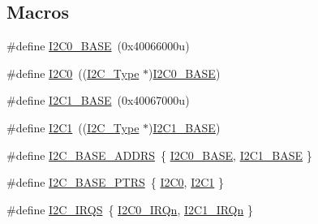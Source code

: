 \subsection*{Macros}
\begin{DoxyCompactItemize}
\item 
\#define \mbox{\hyperlink{group___i2_c___peripheral___access___layer_gabf0928baf4e4350633ca9050b65d1939}{I2\+C0\+\_\+\+B\+A\+SE}}~(0x40066000u)
\item 
\#define \mbox{\hyperlink{group___i2_c___peripheral___access___layer_ga86abb2e8858d177c04e60c41e9242045}{I2\+C0}}~((\mbox{\hyperlink{struct_i2_c___type}{I2\+C\+\_\+\+Type}} $\ast$)\mbox{\hyperlink{group___i2_c___peripheral___access___layer_gabf0928baf4e4350633ca9050b65d1939}{I2\+C0\+\_\+\+B\+A\+SE}})
\item 
\#define \mbox{\hyperlink{group___i2_c___peripheral___access___layer_gacd72dbffb1738ca87c838545c4eb85a3}{I2\+C1\+\_\+\+B\+A\+SE}}~(0x40067000u)
\item 
\#define \mbox{\hyperlink{group___i2_c___peripheral___access___layer_gab45d257574da6fe1f091cc45b7eda6cc}{I2\+C1}}~((\mbox{\hyperlink{struct_i2_c___type}{I2\+C\+\_\+\+Type}} $\ast$)\mbox{\hyperlink{group___i2_c___peripheral___access___layer_gacd72dbffb1738ca87c838545c4eb85a3}{I2\+C1\+\_\+\+B\+A\+SE}})
\item 
\#define \mbox{\hyperlink{group___i2_c___peripheral___access___layer_gae92fd6c5f532d79f1a47e76c6dbc33f0}{I2\+C\+\_\+\+B\+A\+S\+E\+\_\+\+A\+D\+D\+RS}}~\{ \mbox{\hyperlink{group___i2_c___peripheral___access___layer_gabf0928baf4e4350633ca9050b65d1939}{I2\+C0\+\_\+\+B\+A\+SE}}, \mbox{\hyperlink{group___i2_c___peripheral___access___layer_gacd72dbffb1738ca87c838545c4eb85a3}{I2\+C1\+\_\+\+B\+A\+SE}} \}
\item 
\#define \mbox{\hyperlink{group___i2_c___peripheral___access___layer_gaee17f364d6d1712b62774e6c33dea554}{I2\+C\+\_\+\+B\+A\+S\+E\+\_\+\+P\+T\+RS}}~\{ \mbox{\hyperlink{group___i2_c___peripheral___access___layer_ga86abb2e8858d177c04e60c41e9242045}{I2\+C0}}, \mbox{\hyperlink{group___i2_c___peripheral___access___layer_gab45d257574da6fe1f091cc45b7eda6cc}{I2\+C1}} \}
\item 
\#define \mbox{\hyperlink{group___i2_c___peripheral___access___layer_gaa8773ffc80a322ac3833d4ad1853185a}{I2\+C\+\_\+\+I\+R\+QS}}~\{ \mbox{\hyperlink{group___interrupt__vector__numbers_gga666eb0caeb12ec0e281415592ae89083a0f1945c7372a6de732306ea3801c8e2a}{I2\+C0\+\_\+\+I\+R\+Qn}}, \mbox{\hyperlink{group___interrupt__vector__numbers_gga666eb0caeb12ec0e281415592ae89083af651b1769e03e4653b1a4a7c88132398}{I2\+C1\+\_\+\+I\+R\+Qn}} \}
\end{DoxyCompactItemize}


